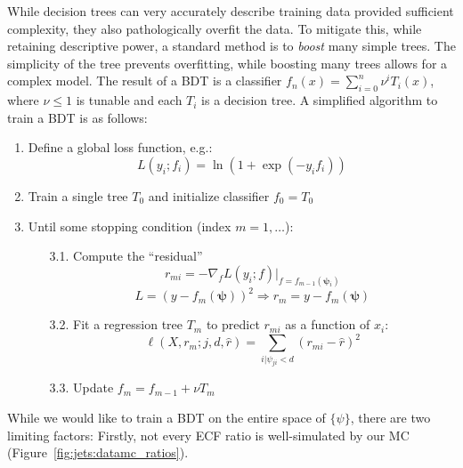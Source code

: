 While decision trees can very accurately describe training data provided sufficient complexity, they also pathologically overfit the data.
To mitigate this, while retaining descriptive power, a standard method is to \emph{boost} many simple trees.
The simplicity of the tree prevents overfitting, while boosting many trees allows for a complex model.
The result of a BDT is a classifier $f_n(x) = \sum_{i=0}^n \nu^i T_i(x)$, where $\nu\leq 1$ is tunable and each $T_i$ is a decision tree. 
A simplified algorithm to train a BDT is as follows:
\begin{enumerate}
    \item Define a global loss function, e.g.:
        \begin{equation} L(y_i; f_i) = \ln\left(1 + \exp(-y_if_i)\right)\end{equation}
    \item Train a single tree $T_0$ and initialize classifier $f_0 = T_0$
    \item Until some stopping condition (index $m=1,\dots$):
    \begin{enumerate}
      \item[3.1.] Compute the ``residual''
        \begin{equation}r_{mi} = -\nabla_f L(y_i; f) |_{f=f_{m-1}(\bm\psi_i)}\end{equation}
        \begin{equation}L = (y-f_m(\bm\psi))^2 \Rightarrow r_m = y - f_m(\bm\psi) \end{equation}
      \item[3.2.] Fit a regression tree $T_m$ to predict $r_{mi}$ as a function of $x_i$:
        \begin{equation}\ell(X,r_m;j,d,\hat{r}) = \sum_{i | \psi_{ji} < d} (r_{mi} - \hat r)^2\end{equation}
      \item[3.3.] Update $f_m = f_{m-1} + \nu T_m$
    \end{enumerate}
\end{enumerate}

While we would like to train a BDT on the entire space of $\{\psi\}$, there are two limiting factors:
Firstly, not every ECF ratio is well-simulated by our MC (Figure~\ref{fig:jets:datamc_ratios}).

